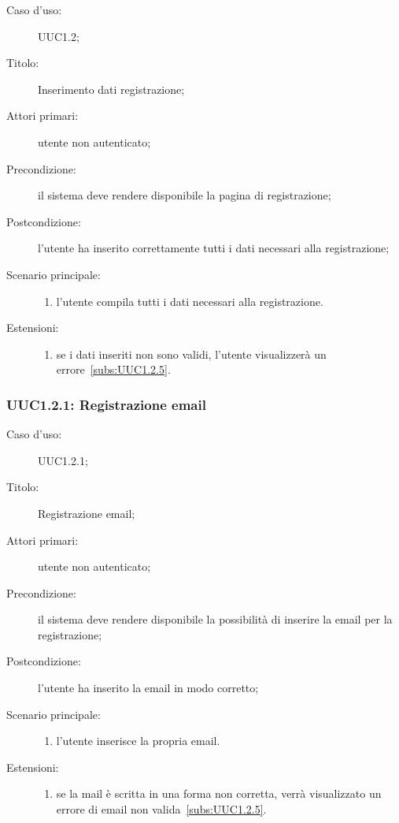 \documentclass[../../../analisi-dei-requisiti.tex]{subfiles}
\begin{document}
\begin{description}
  \item[Caso d’uso:] UUC1.2;
  \item[Titolo:] Inserimento dati registrazione;
  \item[Attori primari:] utente non autenticato;
  \item[Precondizione:] il sistema deve rendere disponibile la pagina di registrazione;
  \item[Postcondizione:] l'utente ha inserito correttamente tutti i dati necessari alla registrazione;
  \item[Scenario principale:]
  \begin{enumerate}
    \item l'utente compila tutti i dati necessari alla registrazione.
  \end{enumerate}
  \item[Estensioni:]
  \begin{enumerate}
    \item se i dati inseriti non sono validi, l'utente visualizzerà un errore~\ref{subs:UUC1.2.5}.
  \end{enumerate}
\end{description}



\subsubsection{UUC1.2.1: Registrazione email}%
\label{subs:UUC1.2.1}
\begin{description}
  \item[Caso d’uso:] UUC1.2.1;
  \item[Titolo:] Registrazione email;
  \item[Attori primari:] utente non autenticato;
  \item[Precondizione:] il sistema deve rendere disponibile la possibilità di inserire la email per la registrazione;
  \item[Postcondizione:] l'utente ha inserito la email in modo corretto;
  \item[Scenario principale:]
  \begin{enumerate}
    \item l'utente inserisce la propria email.
  \end{enumerate}
  \item[Estensioni:]
  \begin{enumerate}
    \item se la mail è scritta in una forma non corretta, verrà visualizzato un errore di email non valida~\ref{subs:UUC1.2.5}.
  \end{enumerate}
\end{description}
\end{document}
